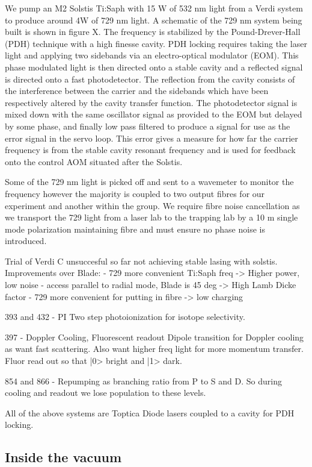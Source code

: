 \documentclass[12pt]{iopart}
\begin{document}
We pump an M2 Solstis Ti:Saph with 15 W of 532 nm light from a Verdi
system to produce around 4W of 729 nm light.  A schematic of the 729
nm system being built is shown in figure X. The frequency is
stabilized by the Pound-Drever-Hall (PDH) technique with a high
finesse cavity. PDH locking requires taking the laser light and
applying two sidebands via an electro-optical modulator (EOM). This
phase modulated light is then directed onto a stable cavity and a
reflected signal is directed onto a fast photodetector. The reflection
from the cavity consists of the interference between the carrier and
the sidebands which have been respectively altered by the cavity
transfer function. The photodetector signal is mixed down with the
same oscillator signal as provided to the EOM but delayed by some
phase, and finally low pass filtered to produce a signal for use as
the error signal in the servo loop.  This error gives a measure for
how far the carrier frequency is from the stable cavity resonant
frequency and is used for feedback onto the control AOM situated after
the Solstis.

Some of the 729 nm light is picked off and sent to a wavemeter to
monitor the frequency however the majority is coupled to two output
fibres for our experiment and another within the group. We require
fibre noise cancellation as we transport the 729 light from a laser
lab to the trapping lab by a 10 m single mode polarization maintaining
fibre and must ensure no phase noise is introduced.


Trial of Verdi C unsuccesful so far not achieving stable lasing with
solstis.
Improvements over Blade:
- 729 more convenient Ti:Saph freq -> Higher power, low noise
- access parallel to radial mode, Blade is 45 deg -> High Lamb Dicke
factor
- 729 more convenient for putting in fibre -> low charging


393 and 432 - PI 
Two step photoionization for isotope selectivity.

397 - Doppler Cooling, Fluorescent readout
Dipole transition for Doppler cooling as want fast scattering. Also
want higher freq light for more momentum transfer.
Fluor read out so that |0> bright and |1> dark.

854 and 866 - Repumping as branching ratio from P to S and D. So
during cooling and readout we lose population to these levels.

All of the above systems are Toptica Diode lasers coupled to a cavity
for PDH locking.


\subsection{Inside the vacuum}
\end{document}
